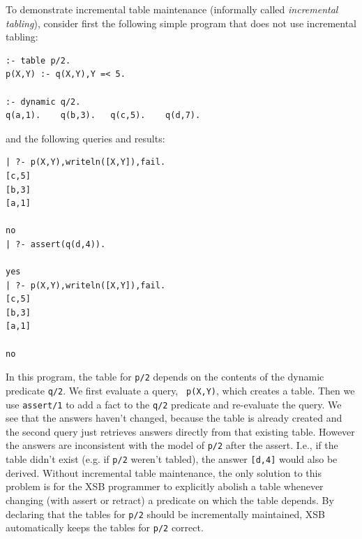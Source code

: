 To demonstrate incremental table maintenance (informally called {\em
  incremental tabling}), consider first the following simple program
that does not use incremental tabling:
\begin{verbatim}
:- table p/2.
p(X,Y) :- q(X,Y),Y =< 5.

:- dynamic q/2.
q(a,1).    q(b,3).   q(c,5).    q(d,7).
\end{verbatim}
and the following queries and results:
\begin{verbatim}
| ?- p(X,Y),writeln([X,Y]),fail.
[c,5]
[b,3]
[a,1]

no
| ?- assert(q(d,4)).

yes
| ?- p(X,Y),writeln([X,Y]),fail.
[c,5]
[b,3]
[a,1]

no
\end{verbatim}
%
In this program, the table for {\tt p/2} depends on the contents of
the dynamic predicate {\tt q/2}.  We first evaluate a query, {\tt
  p(X,Y)}, which creates a table.  Then we use {\tt assert/1} to add a
fact to the {\tt q/2} predicate and re-evaluate the query.  We see
that the answers haven't changed, because the table is already created
and the second query just retrieves answers directly from that
existing table.  However the answers are inconsistent with the model
of {\tt p/2} after the assert.  I.e., if the table didn't exist
(e.g. if {\tt p/2} weren't tabled), the answer {\tt [d,4]} would also
be derived.  Without incremental table maintenance, the only solution
to this problem is for the XSB programmer to explicitly abolish a
table whenever changing (with assert or retract) a predicate on which
the table depends.
%
By declaring that the tables for {\tt p/2} should be incrementally
maintained, XSB automatically keeps the tables for {\tt p/2} correct.

